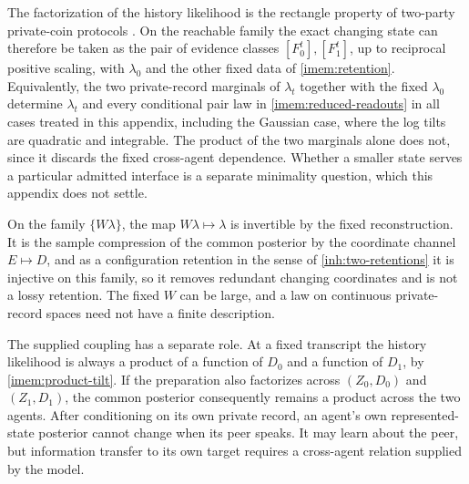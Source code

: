 The factorization of the history likelihood is the rectangle property of two-party private-coin protocols \citep[Lemma 6.7]{BarYossefEtAl2004}. On the reachable family the exact changing state can therefore be taken as the pair of evidence classes $[F_0^t],[F_1^t]$, up to reciprocal positive scaling, with $\lambda_0$ and the other fixed data of \cref{imem:retention}. Equivalently, the two private-record marginals of $\lambda_t$ together with the fixed $\lambda_0$ determine $\lambda_t$ and every conditional pair law in \cref{imem:reduced-readouts} in all cases treated in this appendix, including the Gaussian case, where the log tilts are quadratic and integrable. The product of the two marginals alone does not, since it discards the fixed cross-agent dependence. Whether a smaller state serves a particular admitted interface is a separate minimality question, which this appendix does not settle.

On the family $\{W\lambda\}$, the map $W\lambda\mapsto\lambda$ is invertible by the fixed reconstruction. It is the sample compression of the common posterior by the coordinate channel $E\mapsto D$, and as a configuration retention in the sense of \cref{inh:two-retentions} it is injective on this family, so it removes redundant changing coordinates and is not a lossy retention. The fixed $W$ can be large, and a law on continuous private-record spaces need not have a finite description.

The supplied coupling has a separate role. At a fixed transcript the history likelihood is always a product of a function of $D_0$ and a function of $D_1$, by \cref{imem:product-tilt}. If the preparation also factorizes across $(Z_0,D_0)$ and $(Z_1,D_1)$, the common posterior consequently remains a product across the two agents. After conditioning on its own private record, an agent's own represented-state posterior cannot change when its peer speaks. It may learn about the peer, but information transfer to its own target requires a cross-agent relation supplied by the model.

